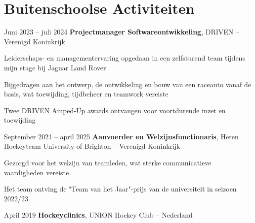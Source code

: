 	\section{Buitenschoolse Activiteiten}
	
	\begin{twocolentry}{
			Juni 2023 – juli 2024
		}
		\textbf{Projectmanager Softwareontwikkeling}, DRIVEN -- Verenigd Koninkrijk\end{twocolentry}
	
	\vspace{0.10 cm}
	\begin{onecolentry}
		\begin{highlights}
			\item Leiderschaps- en managementervaring opgedaan in een zelfsturend team tijdens mijn stage bij Jaguar Land Rover
			\item Bijgedragen aan het ontwerp, de ontwikkeling en bouw van een raceauto vanaf de basis, wat toewijding, tijdbeheer en teamwork vereiste
			\item Twee DRIVEN Amped-Up awards ontvangen voor voortdurende inzet en toewijding
		\end{highlights}
	\end{onecolentry}
	
	\vspace{0.2 cm}
	
	\begin{twocolentry}{
			September 2021 – april 2025
		}
		\textbf{Aanvoerder en Welzijnsfunctionaris}, Heren Hockeyteam University of Brighton -- Verenigd Koninkrijk\end{twocolentry}
	
	\vspace{0.10 cm}
	\begin{onecolentry}
		\begin{highlights}
			\item Gezorgd voor het welzijn van teamleden, wat sterke communicatieve vaardigheden vereiste
			\item Het team ontving de "Team van het Jaar"-prijs van de universiteit in seizoen 2022/23
		\end{highlights}
	\end{onecolentry}
	
	\vspace{0.2 cm}
	
	\begin{twocolentry}{
			April 2019
		}
		\textbf{Hockeyclinics}, UNION Hockey Club -- Nederland
	\end{twocolentry}
	

